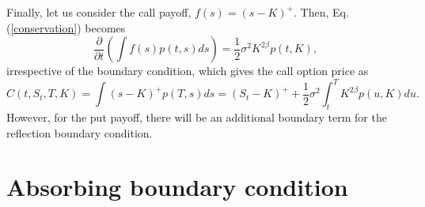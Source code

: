 \documentclass[12pt]{article}
\begin{document}
  Finally, let us consider the call payoff, $f(s)=(s-K)^+$. Then, Eq. (\ref{conservation}) becomes
  \begin{equation}
    \frac{\partial}{\partial t}\left(\int f(s)p(t,s)ds\right) = \frac{1}{2}\sigma^2K^{2\beta}p(t,K),
  \end{equation}
  irrespective of the boundary condition, which gives the call option price as
  \begin{equation}
    C(t,S_t,T,K) = \int (s-K)^+p(T,s)ds = (S_t-K)^++\frac{1}{2}\sigma^2\int_t^T K^{2\beta}p(u,K)du.
    \label{TimeValue}
  \end{equation}
  However, for the put payoff, there will be an additional boundary term for the reflection boundary condition.



\section{Absorbing boundary condition}
\end{document}
